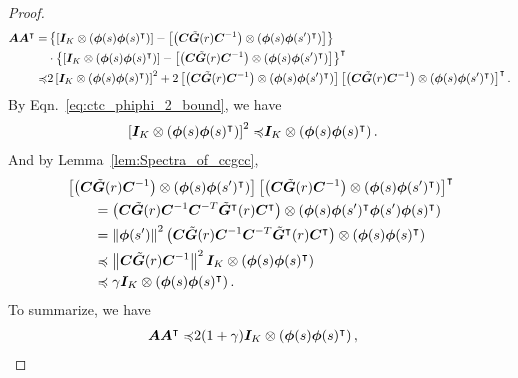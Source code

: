 \begin{proof}
\begin{equation*}
\begin{aligned}
    {\bm{A}}{\bm{A}}^{\intercal}=&\left\{{\left[{{\bm{I}}_K\otimes\left({{\bm{\phi}}(s){\bm{\phi}}(s)^{\intercal}}\right)}\right]-\left[{\left({{\bm{C}}\tilde{{\bm{G}}}(r){\bm{C}}^{-1}}\right)\otimes\left({{\bm{\phi}}(s){\bm{\phi}}(s^\prime)^{\intercal}}\right)}\right]}\right\}\\
    &\cdot\left\{{\left[{{\bm{I}}_K\otimes\left({{\bm{\phi}}(s){\bm{\phi}}(s)^{\intercal}}\right)}\right]-\left[{\left({{\bm{C}}\tilde{{\bm{G}}}(r){\bm{C}}^{-1}}\right)\otimes\left({{\bm{\phi}}(s){\bm{\phi}}(s^\prime)^{\intercal}}\right)}\right]}\right\}^{\intercal}\\
    \preccurlyeq& 2\left[{{\bm{I}}_K\otimes\left({{\bm{\phi}}(s){\bm{\phi}}(s)^{\intercal}}\right)}\right]^2+2\left[{\left({{\bm{C}}\tilde{{\bm{G}}}(r){\bm{C}}^{-1}}\right)\otimes\left({{\bm{\phi}}(s){\bm{\phi}}(s^\prime)^{\intercal}}\right)}\right]\left[{\left({{\bm{C}}\tilde{{\bm{G}}}(r){\bm{C}}^{-1}}\right)\otimes\left({{\bm{\phi}}(s){\bm{\phi}}(s^\prime)^{\intercal}}\right)}\right]^{\intercal}.
\end{aligned}
\end{equation*}
By Eqn.~\eqref{eq:ctc_phiphi_2_bound}, we have
\begin{equation*}
\begin{aligned}
\left[{{\bm{I}}_K\otimes\left({{\bm{\phi}}(s){\bm{\phi}}(s)^{\intercal}}\right)}\right]^2\preccurlyeq&{\bm{I}}_K\otimes\left({{\bm{\phi}}(s){\bm{\phi}}(s)^{\intercal}}\right).
\end{aligned}
\end{equation*}
And by Lemma~\ref{lem:Spectra_of_ccgcc},
\begin{equation*}
\begin{aligned}
   &\left[{\left({{\bm{C}}\tilde{{\bm{G}}}(r){\bm{C}}^{-1}}\right)\otimes\left({{\bm{\phi}}(s){\bm{\phi}}(s^\prime)^{\intercal}}\right)}\right]\left[{\left({{\bm{C}}\tilde{{\bm{G}}}(r){\bm{C}}^{-1}}\right)\otimes\left({{\bm{\phi}}(s){\bm{\phi}}(s^\prime)^{\intercal}}\right)}\right]^{\intercal}\\
   &\qquad =\left({{\bm{C}}\tilde{{\bm{G}}}(r){\bm{C}}^{-1}{\bm{C}}^{-T}\tilde{{\bm{G}}}^{\intercal}(r){\bm{C}}^{\intercal}}\right)\otimes\left({{\bm{\phi}}(s){\bm{\phi}}(s^\prime)^{\intercal}{\bm{\phi}}(s^\prime){\bm{\phi}}(s)^{\intercal}}\right)\\
   &\qquad =\left\|{{\bm{\phi}}(s^\prime)}\right\|^2\left({{\bm{C}}\tilde{{\bm{G}}}(r){\bm{C}}^{-1}{\bm{C}}^{-T}\tilde{{\bm{G}}}^{\intercal}(r){\bm{C}}^{\intercal}}\right)\otimes\left({{\bm{\phi}}(s){\bm{\phi}}(s)^{\intercal}}\right)\\
   &\qquad \preccurlyeq \left\|{{\bm{C}}\tilde{{\bm{G}}}(r){\bm{C}}^{-1}}\right\|^2{\bm{I}}_K\otimes\left({{\bm{\phi}}(s){\bm{\phi}}(s)^{\intercal}}\right)\\
   &\qquad \preccurlyeq \gamma  {\bm{I}}_K\otimes\left({{\bm{\phi}}(s){\bm{\phi}}(s)^{\intercal}}\right).
\end{aligned}
\end{equation*}
To summarize, we have
\begin{equation*}
\begin{aligned}
    \bA\bA^{\intercal}\preccurlyeq&2(1+\gamma)\bI_K\otimes\prn{\bphi(s)\bphi(s)^{\intercal}},

\end{aligned}
\end{equation*}
\end{proof}
